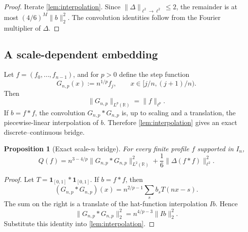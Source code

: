 \documentclass[11pt,reqno]{amsart}
\numberwithin{equation}{section}
\newtheorem{proposition}[proposition]{Proposition}
\theoremstyle{definition}
\theoremstyle{remark}
\newcommand{\R}{\mathbb R}
\newcommand{\one}{\mathbf 1}
\newcommand{\norm}[1]{\lVert #1\rVert}
\begin{document}
\begin{proof}
Iterate \cref{lem:interpolation}.  Since
$\norm\Delta_{\ell^2\to\ell^2}\le2$, the remainder is at most
$(4/6)^M\norm b_2^2$.  The convolution identities follow from the Fourier
multiplier of $\Delta$.
\end{proof}

\subsection{A scale-dependent embedding}

Let $f=(f_0,\ldots,f_{n-1})$, and for $p>0$ define the step function
\begin{equation}\label{eq:Gnp}
  G_{n,p}(x):=n^{1/p}f_j,
  \qquad x\in[j/n,(j+1)/n).
\end{equation}
Then
\begin{equation}\label{eq:Gnp-pnorm}
  \norm{G_{n,p}}_{L^p(\R)}=\norm f_{\ell^p}.
\end{equation}
If $b=f*f$, the convolution $G_{n,p}*G_{n,p}$ is, up to scaling and a
translation, the piecewise-linear interpolation of $b$.  Therefore
\cref{lem:interpolation} gives an exact discrete--continuous bridge.

\begin{proposition}[Exact scale-$n$ bridge]\label{prop:scale-n-bridge}
For every finite profile $f$ supported in $I_n$,
\begin{equation}\label{eq:scale-n-bridge}
  \boxed{
  Q(f)
  =n^{3-4/p}\norm{G_{n,p}*G_{n,p}}_{L^2(\R)}^2
   +\frac16\norm{\Delta(f*f)}_{\ell^2}^2.}
\end{equation}
\end{proposition}

\begin{proof}
Let $T=\one_{[0,1]}*\one_{[0,1]}$.  If $b=f*f$, then
\[
  (G_{n,p}*G_{n,p})(x)
  =n^{2/p-1}\sum_s b_sT(nx-s).
\]
The sum on the right is a translate of the hat-function interpolation
$Ib$.  Hence
\[
  \norm{G_{n,p}*G_{n,p}}_2^2
  =n^{4/p-3}\norm{Ib}_2^2.
\]
Substitute this identity into \cref{lem:interpolation}.
\end{proof}
\end{document}
